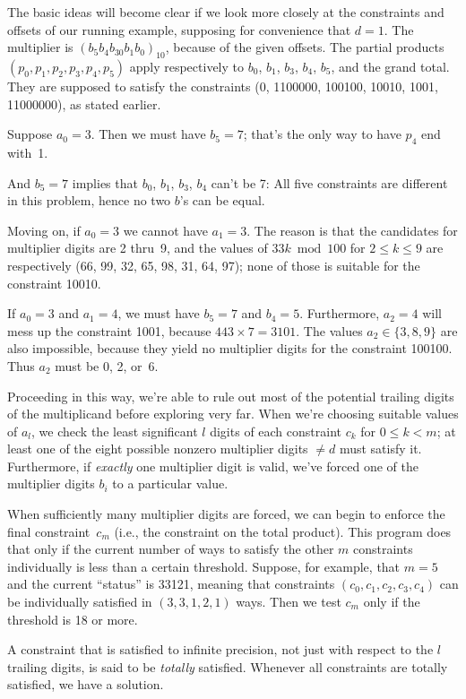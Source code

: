 The basic ideas will become clear if we look more closely at
the constraints and offsets of our running example, supposing for convenience
that $d=1$. The multiplier is $(b_5b_4b_30b_1b_0)_{10}$, because of
the given offsets. The partial products $(p_0,p_1,p_2,p_3,p_4,p_5)$
apply respectively to $b_0$, $b_1$, $b_3$, $b_4$, $b_5$, and the
grand total. They are supposed to satisfy the constraints (0, 1100000, 100100,
10010, 1001, 11000000), as stated earlier.

Suppose $a_0=3$. Then we must have $b_5=7$; that's the only way to
have $p_4$ end with~1.

And $b_5=7$ implies that $b_0$, $b_1$, $b_3$, $b_4$ can't be 7: All five
constraints are different in this problem, hence no two $b$'s can be equal.

Moving on, if $a_0=3$ we cannot have $a_1=3$. The reason is that
the candidates for multiplier digits are 2 thru~9, and the
values of $33k\bmod100$ for $2\le k\le 9$ are respectively
(66, 99, 32, 65, 98, 31, 64, 97); none of those is suitable for
the constraint 10010.

If $a_0=3$ and $a_1=4$, we must have $b_5=7$ and $b_4=5$.
Furthermore, $a_2=4$ will mess up the constraint 1001, because
$443\times7=3101$. The values $a_2\in\{3,8,9\}$
are also impossible, because they yield no multiplier digits for the
constraint 100100. Thus $a_2$ must be 0, 2, or~6.

Proceeding in this way, we're able to rule out most of the potential trailing
digits of the multiplicand before exploring very far. When we're choosing
suitable values of $a_l$, we check the least significant $l$
digits of each constraint $c_k$ for $0\le k<m$; at least one of the eight
possible nonzero multiplier digits $\ne d$ must satisfy it.
Furthermore, if {\it exactly\/} one multiplier digit is valid, we've
forced one of the multiplier digits $b_i$ to a particular value.

When sufficiently many multiplier digits are forced, we can begin to enforce
the final constraint~$c_m$ (i.e., the constraint on the total product).
This program does that only if the current number of ways to satisfy
the other $m$ constraints individually is less than a certain threshold.
Suppose, for example, that $m=5$ and the current ``status'' is 33121,
meaning that constraints $(c_0,c_1,c_2,c_3,c_4)$ can be individually satisfied
in $(3,3,1,2,1)$ ways. Then we test $c_m$ only if the threshold is 18 or more.

A constraint that is satisfied to infinite precision, not just
with respect to the $l$ trailing digits, is said to be {\it totally\/}
satisfied. Whenever all constraints are totally satisfied, we have a
solution.

